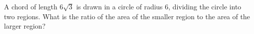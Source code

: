 A chord of length $6\sqrt3$ is drawn in a circle of radius $6$, dividing the circle into two regions. What is the ratio of the area of the smaller region to the area of the larger region?
